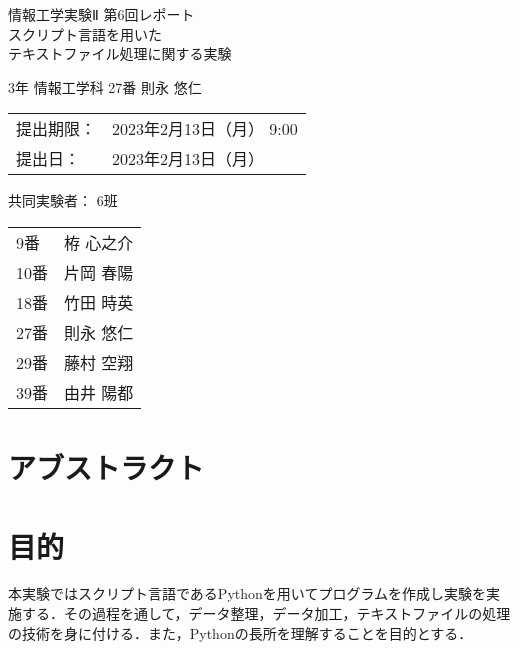 \documentclass[uplatex,dvipdfmx,12pt]{jsarticle}
\begin{document}
\begin{titlepage}
  \begin{center}
    \begin{huge}
      情報工学実験Ⅱ 第6回レポート \\ \vspace{1em}
      スクリプト言語を用いた\\テキストファイル処理に関する実験
    \end{huge}
  \end{center}
  \vspace{3em}
  \begin{flushright}
    \begin{LARGE}
      \thispagestyle{empty}
      3年 情報工学科 27番  則永 悠仁\\ \vspace{1em}

    \end{LARGE}
  \end{flushright}

  \vspace{6em}

  \begin{Large}
    \begin{tabular}{ll}
      提出期限： & 2023年2月13日（月） 9:00 \\
      提出日：   & 2023年2月13日（月）
    \end{tabular}
    \vspace{2em}

    共同実験者： 6班

    \vspace{1em}
    \begin{tabular}{ll}
      9番  & 栫 心之介 \\
      10番 & 片岡 春陽 \\
      18番 & 竹田 時英 \\
      27番 & 則永 悠仁 \\
      29番 & 藤村 空翔 \\
      39番 & 由井 陽都 \\
    \end{tabular}
  \end{Large}
\end{titlepage}

\newpage
\section*{アブストラクト}

\newpage
\section{目的}
本実験ではスクリプト言語であるPythonを用いてプログラムを作成し実験を実施する．その過程を通して，データ整理，データ加工，テキストファイルの処理の技術を身に付ける．また，Pythonの長所を理解することを目的とする．
\end{document}
